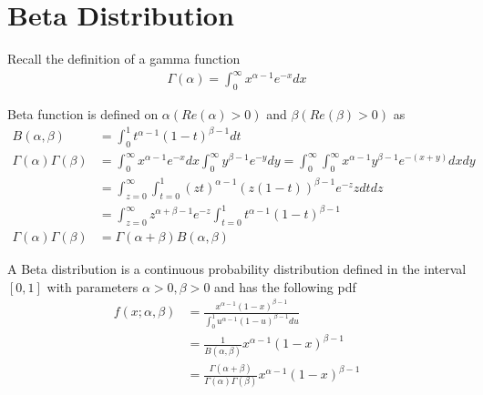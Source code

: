\documentclass[../../probability-notes.tex]{subfiles}
\begin{document}
    \section{Beta Distribution}
    Recall the definition of a gamma function
    \begin{align*}
        \Gamma(\alpha) = \int_{0}^{\infty} x^{\alpha - 1}e^{-x}dx
    \end{align*}

    Beta function is defined on $\alpha (Re(\alpha) > 0)$ and $\beta (Re(\beta) > 0)$ as
    \begin{align*}
        B(\alpha, \beta) &= \int_{0}^{1} t^{\alpha-1} (1-t)^{\beta - 1} dt\\
        \Gamma(\alpha)\Gamma(\beta) &= \int_{0}^{\infty} x^{\alpha - 1}e^{-x}dx \int_{0}^{\infty} y^{\beta - 1}e^{-y}dy = \int_{0}^{\infty}\int_{0}^{\infty}x^{\alpha - 1}y^{\beta - 1}e^{-(x+y)} dxdy\\
        &= \int_{z=0}^{\infty}\int_{t=0}^{1} (zt)^{\alpha - 1} (z(1-t))^{\beta - 1} e^{-z} zdtdz\\
        &= \int_{z=0}^{\infty} z^{\alpha + \beta - 1} e^{-z} \int_{t=0}^{1} t^{\alpha - 1} (1-t)^{\beta - 1}\\
        \Gamma(\alpha)\Gamma(\beta) &= \Gamma(\alpha+\beta) B(\alpha, \beta)
    \end{align*}

    A Beta distribution is a continuous probability distribution defined in the interval $[0,1]$ with parameters $\alpha >0, \beta >0$ and has the following pdf
    \begin{align*}
        f(x;\alpha, \beta) &= \frac{x^{\alpha - 1}(1-x)^{\beta - 1}}{\int_{0}^{1} u^{\alpha - 1}(1-u)^{\beta - 1} du}\\
        &= \frac{1}{B(\alpha, \beta)} x^{\alpha - 1}(1-x)^{\beta - 1}\\
        &= \frac{\Gamma(\alpha+\beta)}{\Gamma(\alpha)\Gamma(\beta)} x^{\alpha - 1}(1-x)^{\beta - 1}
    \end{align*}
\end{document}
